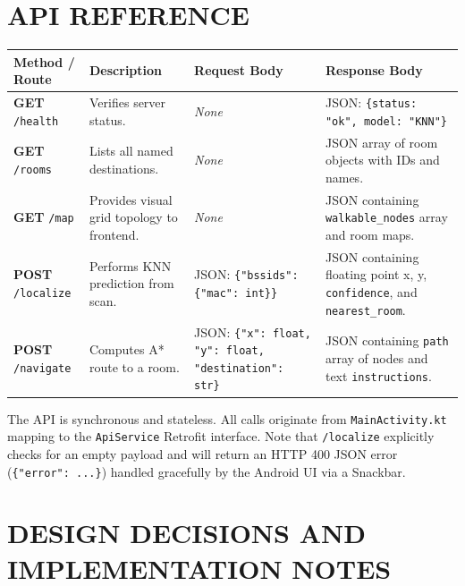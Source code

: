 \documentclass[11pt,a4paper]{article}
\begin{document}
\section{API REFERENCE}
\begin{center}
\renewcommand{\arraystretch}{1.3}
\begin{tabular}{@{}p{}p{}p{}p{}@{}}
\toprule
\textbf{Method / Route} & \textbf{Description} & \textbf{Request Body} & \textbf{Response Body} \\ \midrule
\textbf{GET} \texttt{/health} & Verifies server status. & \textit{None} & JSON: \texttt{\{status: "ok", model: "KNN"\}} \\
\textbf{GET} \texttt{/rooms} & Lists all named destinations. & \textit{None} & JSON array of room objects with IDs and names. \\
\textbf{GET} \texttt{/map} & Provides visual grid topology to frontend. & \textit{None} & JSON containing \texttt{walkable\_nodes} array and room maps. \\
\textbf{POST} \texttt{/localize} & Performs KNN prediction from scan. & JSON: \texttt{\{"bssids": \{"mac": int\}\}} & JSON containing floating point x, y, \texttt{confidence}, and \texttt{nearest\_room}. \\
\textbf{POST} \texttt{/navigate} & Computes A* route to a room. & JSON: \texttt{\{"x": float, "y": float, "destination": str\}} & JSON containing \texttt{path} array of nodes and text \texttt{instructions}. \\
\bottomrule
\end{tabular}
\end{center}
The API is synchronous and stateless. All calls originate from \texttt{MainActivity.kt} mapping to the \texttt{ApiService} Retrofit interface. Note that \texttt{/localize} explicitly checks for an empty payload and will return an HTTP 400 JSON error (\texttt{\{"error": ...\}}) handled gracefully by the Android UI via a Snackbar.
\section{DESIGN DECISIONS AND IMPLEMENTATION NOTES}
\end{document}
